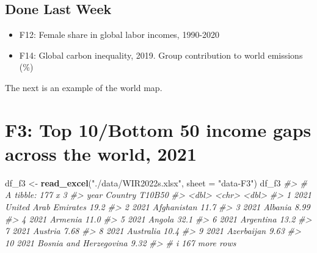 \documentclass[
  xelatex, ja=standard]{bxjsbook}
\newenvironment{Shaded}{\begin{snugshade}}{\end{snugshade}}
\newcommand{\AttributeTok}[1]{\textcolor[rgb]{0.13,0.29,0.53}{#1}}
\newcommand{\CommentTok}[1]{\textcolor[rgb]{0.56,0.35,0.01}{\textit{#1}}}
\newcommand{\FunctionTok}[1]{\textcolor[rgb]{0.13,0.29,0.53}{\textbf{#1}}}
\newcommand{\NormalTok}[1]{#1}
\newcommand{\OtherTok}[1]{\textcolor[rgb]{0.56,0.35,0.01}{#1}}
\newcommand{\StringTok}[1]{\textcolor[rgb]{0.31,0.60,0.02}{#1}}
\providecommand{\tightlist}{%
  \setlength{\itemsep}{0pt}\setlength{\parskip}{0pt}}
\theoremstyle{definition}
\theoremstyle{definition}
\theoremstyle{definition}
\theoremstyle{definition}
\theoremstyle{remark}
\begin{document}
\hypertarget{done-last-week}{%
\subsection{Done Last Week}\label{done-last-week}}

\begin{itemize}
\tightlist
\item
  F12: Female share in global labor incomes, 1990-2020
\item
  F14: Global carbon inequality, 2019. Group contribution to world emissions (\%)
\end{itemize}

The next is an example of the world map.

\hypertarget{f3-top-10bottom-50-income-gaps-across-the-world-2021}{%
\section{F3: Top 10/Bottom 50 income gaps across the world, 2021}\label{f3-top-10bottom-50-income-gaps-across-the-world-2021}}

\begin{Shaded}
\begin{Highlighting}[]
\NormalTok{df\_f3 }\OtherTok{\textless{}{-}} \FunctionTok{read\_excel}\NormalTok{(}\StringTok{"./data/WIR2022s.xlsx"}\NormalTok{, }\AttributeTok{sheet =} \StringTok{"data{-}F3"}\NormalTok{)}
\NormalTok{df\_f3}
\CommentTok{\#\textgreater{} \# A tibble: 177 x 3}
\CommentTok{\#\textgreater{}     year Country                T10B50}
\CommentTok{\#\textgreater{}    \textless{}dbl\textgreater{} \textless{}chr\textgreater{}                   \textless{}dbl\textgreater{}}
\CommentTok{\#\textgreater{}  1  2021 United Arab Emirates    19.2 }
\CommentTok{\#\textgreater{}  2  2021 Afghanistan             11.7 }
\CommentTok{\#\textgreater{}  3  2021 Albania                  8.99}
\CommentTok{\#\textgreater{}  4  2021 Armenia                 11.0 }
\CommentTok{\#\textgreater{}  5  2021 Angola                  32.1 }
\CommentTok{\#\textgreater{}  6  2021 Argentina               13.2 }
\CommentTok{\#\textgreater{}  7  2021 Austria                  7.68}
\CommentTok{\#\textgreater{}  8  2021 Australia               10.4 }
\CommentTok{\#\textgreater{}  9  2021 Azerbaijan               9.63}
\CommentTok{\#\textgreater{} 10  2021 Bosnia and Herzegovina   9.32}
\CommentTok{\#\textgreater{} \# i 167 more rows}
\end{Highlighting}
\end{Shaded}
\end{document}
